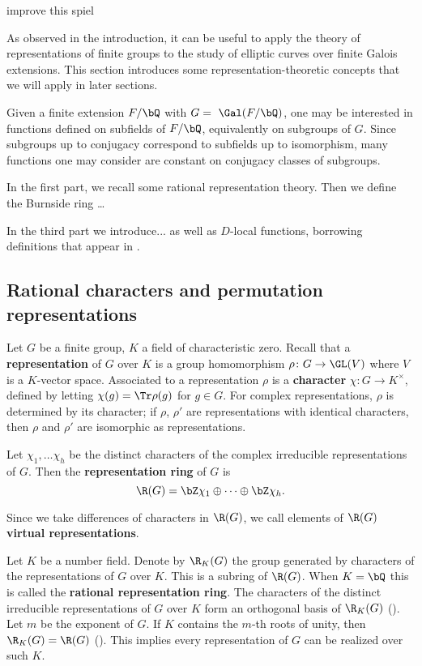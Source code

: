 {\color{red} improve this spiel}

As observed in the introduction, it can be useful to apply the theory of representations of finite groups to the study of elliptic curves over finite Galois extensions. This section introduces some representation-theoretic concepts that we will apply in later sections. 

Given a finite extension $F / \bQ$ with $G = \ \Gal(F / \bQ)$, one may be interested in functions defined on subfields of $F / \bQ$, equivalently on subgroups of $G$. Since subgroups up to conjugacy correspond to subfields up to isomorphism, many functions one may consider are constant on conjugacy classes of subgroups. 

In the first part, we recall some rational representation theory. Then we define the Burnside ring{\color{red} \ldots}

In the third part we introduce... as well as $D$-local functions, borrowing definitions that appear in \cite[Section 2.iii]{reg-const}.

\subsection{Rational characters and permutation representations}\label{rep}

Let $G$ be a finite group, $K$ a field of characteristic zero. Recall that a \textbf{representation} of $G$ over $K$ is a group homomorphism $\rho \colon G \to \GL(V)$ where $V$ is a $K$-vector space. Associated to a representation $\rho$ is a \textbf{character} $\chi \colon G \to K^{\times}$, defined by letting $\chi(g) = \Tr \rho(g)$ for $g \in G$. For complex representations, $\rho$ is determined by its character; if $\rho$, $\rho'$ are representations with identical characters, then $\rho$ and $\rho'$ are isomorphic as representations. 

\begin{defn}\label{rep-ring}
Let $\chi_1, \ldots \chi_h$ be the distinct characters of the complex irreducible representations of $G$. 
Then the \textbf{representation ring} of $G$ is 
\[ \R(G) = \bZ \chi_1 \oplus \cdots \oplus \bZ \chi_h .\]
\end{defn}

Since we take differences of characters in $\R(G)$, we call elements of $\R(G)$ \textbf{virtual representations}. 

Let $K$ be a number field. Denote by $\R_K(G)$ the group generated by characters of the representations of $G$ over $K$. This is a subring of $\R(G)$.
When $K = \bQ$ this is called the \textbf{rational representation ring}.
The characters of the distinct irreducible representations of $G$ over $K$ form an orthogonal basis of $\R_K(G)$ (\cite[Proposition 32]{Serre}).
Let $m$ be the exponent of $G$. If $K$ contains the $m$-th roots of unity, then $\R_K(G) = \R(G)$ (\cite[Theorem 24]{Serre}). This implies every representation of $G$ can be realized over such $K$. 
\vspace{1em}

